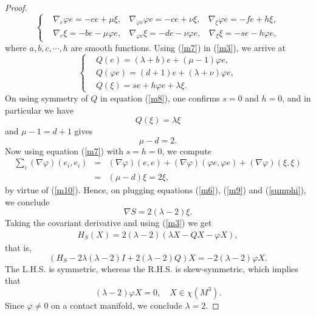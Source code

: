 \documentclass[a4paper, twoside, 10pt]{article}
\numberwithin{equation}{section}
\theoremstyle{definition}
\begin{document}
\begin{proof}
\begin{equation}
\begin{cases}
       & \nabla_e \varphi e= -ce+\mu\xi,~~~~ \nabla_{\varphi e} \varphi e= -ce +\nu\xi,~~~~ \nabla_\xi \varphi e=-fe + h \xi ,  \\
       & \nabla_e\xi =- b e - \mu \varphi e,~~~~ \nabla_{\varphi e}\xi=-d e - \nu \varphi e ,~~~~ \nabla_\xi\xi= -se - h \varphi e,
    \end{cases}
  \end{equation}
where $a, b, c, \cdots, h$ are smooth functions. Using
(\ref{m7}) in (\ref{m3}), we arrive at
\begin{equation}\label{m8}
    \begin{cases}
       & Q(e) = (\lambda+b)e + (\mu - 1) \varphi e,   \\
       & Q(\varphi e) = (d + 1)e +(\lambda + \nu)\varphi e,  \\
       & Q(\xi) = se + h \varphi e + \lambda \xi.
    \end{cases}
\end{equation}
On using symmetry of $Q$ in equation (\ref{m8}), one
confirms $s=0$ and $h = 0$, and in particular we have
\begin{equation}\label{m9}
Q(\xi) = \lambda \xi
\end{equation}
and $\mu - 1 = d + 1$ gives
\begin{equation}\label{m10}
\mu - d = 2.
\end{equation}
Now using equation (\ref{m7}) with $s = h = 0$, we compute
\begin{eqnarray}\label{m11}
\sum_{i} (\nabla \varphi)(e_i, e_i) & = &
(\nabla \varphi)(e, e) + (\nabla \varphi)(\varphi e, \varphi e) + (\nabla \varphi)(\xi, \xi)\\ \label{sumphi}
& = & (\mu - d) \xi = 2\xi,
\end{eqnarray}
by virtue of (\ref{m10}). Hence, on plugging equations
(\ref{m6}), (\ref{m9}) and (\ref{sumphi}), we conclude
\begin{equation}\label{gradS}
\nabla S = 2(\lambda - 2) \xi.
\end{equation}
Taking the covariant derivative and using (\ref{m3}) we get
\begin{eqnarray}
H_S(X) = 2(\lambda - 2)(\lambda X - QX - \varphi X),
\end{eqnarray}
that is,
$$ \left(H_{S} - 2\lambda (\lambda - 2)I + 2(\lambda - 2) Q \right) X
= -2 (\lambda - 2) \varphi X.$$
The L.H.S. is symmetric, whereas the R.H.S. is skew-symmetric, which
implies that
$$ (\lambda - 2) \varphi X = 0, \quad X \in \chi(M^3).$$
Since $\varphi \neq 0$ on a contact manifold, we conclude
$\lambda = 2$.


\end{proof}
\end{document}
